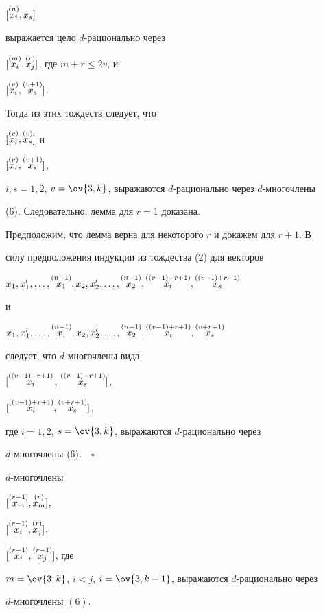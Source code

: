 $[\overset{(n)}{x_i}{},x_s]$


выражается цело $d$-рационально через


$[\overset{(m)}{x_i}{},\overset{(r)}{x_j}{}]$, где $m+r\le2v$, и


$[\overset{(v)}{x_i}{},\overset{(v+1)}{x_s}{}]$.


Тогда из этих тождеств следует, что


$[\overset{(v)}{x_i}{},\overset{(v)}{x_s}{}]$ и


$[\overset{(v)}{x_i}{},\overset{(v+1)}{x_s}{}]$,


$i,s=1,2$, $v=\ov{3,k}$, выражаются $d$-рационально через $d$-многочлены 


(6). Следовательно, лемма для $r=1$ доказана.





Предположим, что лемма верна для некоторого $r$ и докажем для $r+1$. В 


силу предположения индукции из тождества (2) для векторов


$x_1,x'_1,\dotsc,\up{(n-1)}{x_1},x_2,x'_2,\dotsc,


\up{(n-1)}{x_2},\up{((v-1)+r+1)}{x_i},\up{((v-1)+r+1)}{x_s}$


и


$x_1,x'_1,\dotsc,\up{(n-1)}{x_1},x_2,x'_2,\dotsc,


\up{(n-1)}{x_2},\up{((v-1)+r+1)}{x_i},\up{(v+r+1)}{x_s}$


следует, что $d$-многочлены вида


$[\overset{((v-1)+r+1)}{x_i}{}$, $\overset{((v-1)+r+1)}{x_s}{}]$,




$[\overset{((v-1)+r+1)}{x_i}{}, \overset{(v+r+1)}{x_s}{}]$,


где $i=1,2$, $s=\ov{3,k}$, выражаются $d$-рационально через 


$d$-многочлены (6).$\quad\square$ 





\begin{lem}


$d$-многочлены


$[\overset{(r-1)}{x_m}{},\overset{(r)}{x_m}{}]$,


$[\overset{(r-1)}{x_i}{},\overset{(r)}{x_j}{}]$,


$[\overset{(r-1)}{x_i}{},\overset{(r-1)}{x_j}{}]$, где


$m=\ov{3,k}$, $i<j$, $i=\ov{3,k-1}$, выражаются $d$-рационально через 


$d$-многочлены $(6)$. 


\end{lem}





